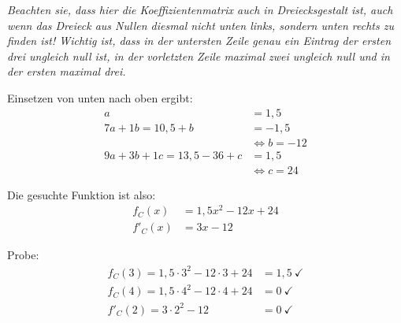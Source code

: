 \documentclass[11pt, a4paper,
]{scrartcl}
\begin{document}
\begin{aufgabe}
\begin{loesung}
\begin{description}
				\textit{Beachten sie, dass hier die Koeffizientenmatrix auch in Dreiecksgestalt ist, auch wenn das Dreieck aus Nullen diesmal nicht unten links, sondern unten rechts zu finden ist!
				Wichtig ist, dass in der untersten Zeile genau ein Eintrag der ersten drei ungleich null ist,
				in der vorletzten Zeile maximal zwei ungleich null und in der ersten maximal drei.}
			
			
				Einsetzen von unten nach oben ergibt:
				\begin{align*}
				a &= 1,5 \\
				7a + 1b = 10,5 + b &= -1,5 \\
				&\Leftrightarrow b = -12 \\
				9a + 3b + 1c = 13,5 - 36 + c &= 1,5 \\
				&\Leftrightarrow c = 24
				\end{align*}
				
				Die gesuchte Funktion ist also:
				\begin{align*}
					f_C(x) &= 1,5x^2 - 12x + 24 \\
					f'_C(x) &= 3x - 12
				\end{align*}
				
				Probe:
				\begin{align*}
				f_C(3) = 1,5\cdot 3^2 - 12\cdot 3 + 24 &= 1,5 \ \checkmark \\
				f_C(4) = 1,5\cdot 4^2 - 12\cdot 4 + 24 &= 0 \ \checkmark \\
				f'_C(2) = 3\cdot 2^2 - 12 &= 0 \ \checkmark
				\end{align*}
			\end{description}
		\end{loesung}
	\end{aufgabe}
\end{document}
